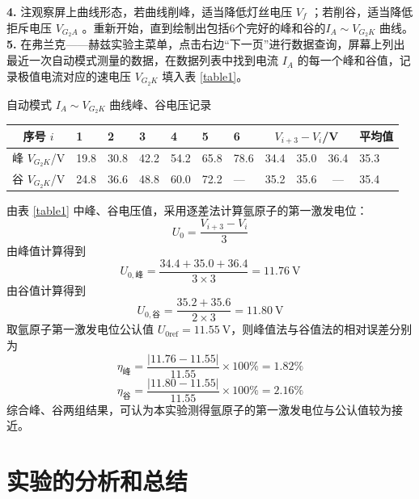 \documentclass{../template/myrpt}
\begin{document}
\begin{minipage}[t]{0.95\linewidth}
\textbf{4.} 注观察屏上曲线形态，若曲线削峰，适当降低灯丝电压 $V_f$ ；若削谷，适当降低拒斥电压 $ V_{G_2A}$ 。重新开始，直到绘制出包括6个完好的峰和谷的$I_A \sim V_{G_2K}$ 曲线。\\
\textbf{5.} 在弗兰克——赫兹实验主菜单，点击右边“下一页”进行数据查询，屏幕上列出最近一次自动模式测量的数据，在数据列表中找到电流 $I_A$ 的每一个峰和谷值，记录极值电流对应的速电压 $V_{G_2K}$ 填入表 \ref{table1}。
  
\end{minipage}


\begin{LabRecordTable}
\centering
\caption{自动模式 $I_A \sim V_{G_2K}$ 曲线峰、谷电压记录}
\label{table1}
\setlength{\tabcolsep}{3pt} %
\begin{tabularx}{\textwidth}{c *{6}{C} *{3}{c} C} %
\toprule
{序号 $i$} & 1 & 2 & 3 & 4 & 5 & 6 
&  
& \mbox{平均值} \\
\midrule
峰 $V_{G_2K}$/V & 19.8 & 30.8 & 42.2 & 54.2 & 65.8 & 78.6 & 34.4 & 35.0 & 36.4 & 35.3 \\
谷 $V_{G_2K}$/V & 24.8 & 36.6 & 48.8 & 60.0 & 72.2 & --- & 35.2 & 35.6 & --- & 35.4 \\
\bottomrule
\end{tabularx}
\end{LabRecordTable}

由表 \ref{table1} 中峰、谷电压值，采用逐差法计算氩原子的第一激发电位：
\[
  U_0 = \frac{V_{i+3}-V_i}{3}
\]
由峰值计算得到
\[
  U_{0,\text{峰}} = \frac{34.4 + 35.0 + 36.4}{3 \times 3} = 11.76\ \text{V}
\]
由谷值计算得到
\[
  U_{0,\text{谷}} = \frac{35.2 + 35.6}{2 \times 3} = 11.80\ \text{V}
\]
取氩原子第一激发电位公认值 $U_{0\text{ref}} = 11.55\ \text{V}$，则峰值法与谷值法的相对误差分别为
\[
  \eta_{\text{峰}} = \frac{|11.76 - 11.55|}{11.55} \times 100\% = 1.82\%
\]
\[
  \eta_{\text{谷}} = \frac{|11.80 - 11.55|}{11.55} \times 100\% = 2.16\%
\]
综合峰、谷两组结果，可认为本实验测得氩原子的第一激发电位与公认值较为接近。

\section{实验的分析和总结}
\end{document}
